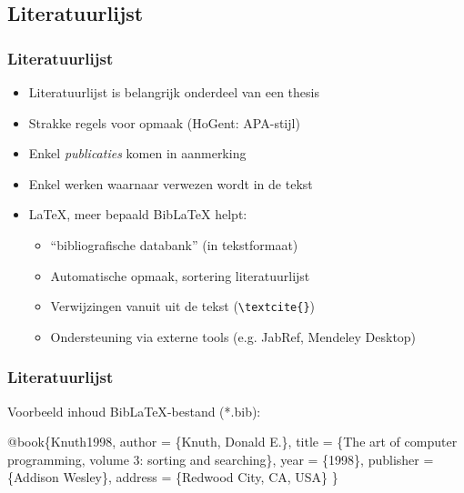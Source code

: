 \documentclass{beamer}
\begin{document}
\subsection{Literatuurlijst}

\begin{frame}[fragile]
  \frametitle{Literatuurlijst}
  
  \begin{itemize}
  \item<+-> Literatuurlijst is belangrijk onderdeel van een thesis
  \item<+-> Strakke regels voor opmaak (HoGent: APA-stijl)
  \item<+-> Enkel \emph{publicaties} komen in aanmerking
  \item<+-> Enkel werken waarnaar verwezen wordt in de tekst
  \item<+-> {\LaTeX}, meer bepaald Bib{\LaTeX} helpt:
    \begin{itemize}
    \item<+-> ``bibliografische databank'' (in tekstformaat)
    \item<+-> Automatische opmaak, sortering literatuurlijst
    \item<+-> Verwijzingen vanuit uit de tekst (\verb|\textcite{}|)
    \item<+-> Ondersteuning via externe tools (e.g. JabRef, Mendeley Desktop)
    \end{itemize} 
  \end{itemize}
\end{frame}

\begin{frame}[fragile]
  \frametitle{Literatuurlijst}

Voorbeeld inhoud Bib{\LaTeX}-bestand (*.bib):

\begin{semiverbatim}
\alert<2>{@book}\{\alert<4>{Knuth1998},
 \alert<3>{author} = \{Knuth, Donald E.\},
 \alert<3>{title} = \{The art of computer programming,  volume 3:
   sorting and searching\},
 \alert<3>{year} = \{1998\},
 publisher = \{Addison Wesley\},
 address = \{Redwood City, CA, USA\}
\} 
\end{semiverbatim}


\end{frame}
\end{document}
